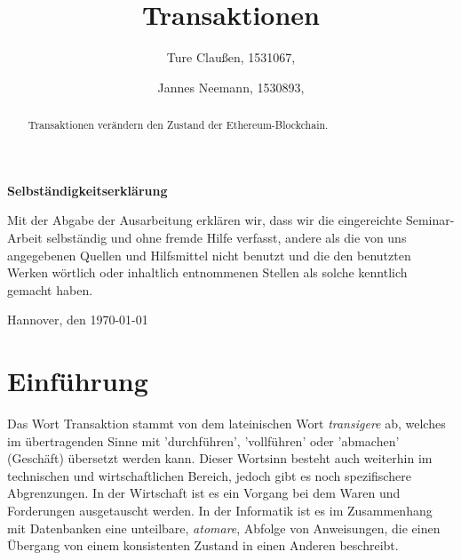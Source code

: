 \documentclass[runningheads]{llncs}
\begin{document}
\title{Transaktionen}
\author{Ture Claußen, 1531067,  \and Jannes Neemann, 1530893, }

{\def\addcontentsline#1#2#3{}\maketitle} %

\begin{center} \sffamily\bfseries Selbständigkeitserklärung \end{center}

Mit der Abgabe der Ausarbeitung erklären wir, dass wir die eingereichte Seminar-Arbeit
selbständig und ohne fremde Hilfe verfasst, andere als die von uns angegebenen Quellen
und Hilfsmittel nicht benutzt und die den benutzten Werken wörtlich oder
inhaltlich entnommenen Stellen als solche kenntlich gemacht haben.
\vspace*{7ex}

Hannover, den \today \hfill



\begin{abstract}
  Transaktionen verändern den Zustand der Ethereum-Blockchain.  
\end{abstract}

%
%
%
\section{Einführung}
Das Wort Transaktion stammt von dem lateinischen Wort \textit{transigere} ab, welches im übertragenden Sinne mit 'durchführen', 'vollführen' oder 'abmachen' (Geschäft) übersetzt werden kann. \cite{noauthor_transigere_nodate} Dieser Wortsinn besteht auch weiterhin im technischen und wirtschaftlichen Bereich, jedoch gibt es noch spezifischere Abgrenzungen. In der Wirtschaft ist es ein Vorgang bei dem Waren und Forderungen ausgetauscht werden. \cite[S. 18 f.]{ehrlicher_kompendium_1975} In der Informatik ist es im Zusammenhang mit Datenbanken eine unteilbare, \textit{atomare}, Abfolge von Anweisungen, die einen Übergang von einem konsistenten Zustand in einen Anderen beschreibt. \cite[S.520]{herold_grundlagen_2017}
\end{document}
